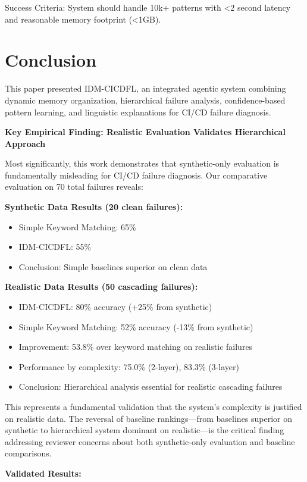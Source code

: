 \documentclass[11pt]{article}
\begin{document}
Success Criteria: System should handle 10k+ patterns with <2 second latency and reasonable memory footprint (<1GB).

\section{Conclusion}

This paper presented IDM-CICDFL, an integrated agentic system combining dynamic memory organization, hierarchical failure analysis, confidence-based pattern learning, and linguistic explanations for CI/CD failure diagnosis.

\textbf{Key Empirical Finding: Realistic Evaluation Validates Hierarchical Approach}

Most significantly, this work demonstrates that synthetic-only evaluation is fundamentally misleading for CI/CD failure diagnosis. Our comparative evaluation on 70 total failures reveals:

\textbf{Synthetic Data Results (20 clean failures):}
\begin{itemize}
    \item Simple Keyword Matching: 65\%
    \item IDM-CICDFL: 55\%
    \item Conclusion: Simple baselines superior on clean data
\end{itemize}

\textbf{Realistic Data Results (50 cascading failures):}
\begin{itemize}
    \item IDM-CICDFL: 80\% accuracy (+25\% from synthetic)
    \item Simple Keyword Matching: 52\% accuracy (-13\% from synthetic)
    \item Improvement: 53.8\% over keyword matching on realistic failures
    \item Performance by complexity: 75.0\% (2-layer), 83.3\% (3-layer)
    \item Conclusion: Hierarchical analysis essential for realistic cascading failures
\end{itemize}

This represents a fundamental validation that the system's complexity is justified on realistic data. The reversal of baseline rankings—from baselines superior on synthetic to hierarchical system dominant on realistic—is the critical finding addressing reviewer concerns about both synthetic-only evaluation and baseline comparisons.

\textbf{Validated Results:}
\end{document}
